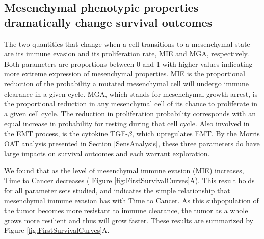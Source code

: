 \documentclass[11pt, preprint]{article}
\newcommand{\tcr} { \textcolor{red} }
\begin{document}
\subsection{Mesenchymal phenotypic properties dramatically change survival outcomes}\label{MesPars}
The two quantities that change when a cell transitions to a mesenchymal state are its immune evasion and its proliferation rate, MIE and MGA, respectively.
Both parameters are proportions between 0 and 1 with higher values indicating more extreme expression of mesenchymal properties.
MIE is the proportional reduction of the probability a mutated mesenchymal cell will undergo immune clearance in a given cycle.
MGA, which stands for mesenchymal growth arrest, is the proportional reduction in any mesenchymal cell of its chance to proliferate in a given cell cycle. 
The reduction in proliferation probability corresponds with an equal increase in probability for resting during that cell cycle.  
Also involved in the EMT process, is the cytokine TGF-$\beta$, which upregulates EMT.
By the Morris OAT analysis presented in Section \ref{SensAnalysis}, these three parameters do have large impacts on survival outcomes and each warrant exploration.


We found that as the level of mesenchymal immune evasion (MIE) increases, Time to Cancer decreases ( Figure \ref{fig:FirstSurvivalCurves}A).
This result holds for all parameter sets studied, and indicates the simple relationship that mesenchymal immune evasion has with Time to Cancer.
As this subpopulation of the tumor becomes more resistant to immune clearance, the tumor as a whole grows more resilient and thus will grow faster.
These results are summarized by Figure \ref{fig:FirstSurvivalCurves}A.
\end{document}
